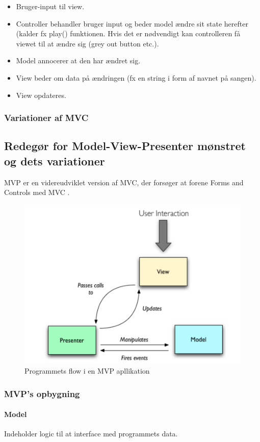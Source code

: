 \begin{itemize}
	\item Bruger-input til view.
	\item Controller behandler bruger input og beder model ændre sit state herefter (kalder fx play() funktionen. Hvis det er nødvendigt kan controlleren få viewet til at ændre sig (grey out button etc.).
	\item Model annocerer at den har ændret sig.
	\item View beder om data på ændringen (fx en string i form af navnet på sangen).
	\item View opdateres.
\end{itemize}

\subsubsection{Variationer af MVC}

\subsection{Redegør for Model-View-Presenter mønstret og dets variationer}
MVP er en videreudviklet version af MVC, der forsøger at forene Forms and Controls med MVC .

\begin{figure}[h]
	\centering
	\includegraphics[width=0.6\linewidth]{figs/mvpFlow}
	\caption{Programmets flow i en MVP apllikation}
	\label{fig:mvpFlow}
\end{figure}

\subsubsection{MVP's opbygning}
\paragraph{Model} Indeholder logic til at interface med programmets data.
